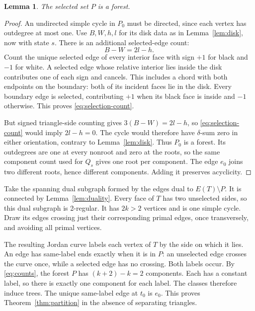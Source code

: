\documentclass[11pt]{article}
\newtheorem{lemma}[theorem]{Lemma}
\theoremstyle{remark}
\numberwithin{equation}{section}
\begin{document}
\begin{lemma}\label{lem:P-forest}
The selected set \(P\) is a forest.
\end{lemma}

\begin{proof}
An undirected simple cycle in \(P_0\) must be
directed, since each vertex has outdegree at most one.
Use \(B,W,h,l\) for its disk data as in
Lemma~\ref{lem:disk}, now with state \(s\).
There is an additional selected-edge count:
\begin{equation}\label{eq:selection-count}
 B-W=2l-h.
\end{equation}
Count the unique selected edge of every interior
face with sign \(+1\) for black and \(-1\) for white.
A selected edge whose relative interior lies inside the disk
contributes one of each sign and cancels. This includes a chord
with both endpoints on the boundary: both of its incident faces
lie in the disk. Every boundary edge
is selected, contributing \(+1\) when its black
face is inside and \(-1\) otherwise. This proves
\eqref{eq:selection-count}.

But signed triangle-side counting gives
\(3(B-W)=2l-h\), so \eqref{eq:selection-count}
would imply \(2l-h=0\). The cycle would therefore have
\(\delta\)-sum zero in either orientation, contrary to
Lemma~\ref{lem:disk}. Thus \(P_0\) is a forest.
Its outdegrees are one at every nonroot and zero at
the roots, so the same component count used for
\(Q_s\) gives one root per component.
The edge \(e_0\) joins two different roots, hence
different components. Adding it preserves acyclicity.
\end{proof}

Take the spanning dual subgraph formed by the edges
dual to \(E(T)\setminus P\). It is connected by
Lemma~\ref{lem:duality}. Every face of \(T\) has two
unselected sides, so this dual subgraph is 2-regular.
It has \(2k>2\) vertices and is one simple cycle.
Draw its edges crossing just their corresponding
primal edges, once transversely, and avoiding all
primal vertices.

The resulting Jordan curve labels each vertex of
\(T\) by the side on which it lies. An edge has
same-label ends exactly when it is in \(P\):
an unselected edge crosses the curve once, while
a selected edge has no crossing. Both labels occur.
By \eqref{eq:counts}, the forest \(P\) has
\((k+2)-k=2\) components. Each has a constant label,
so there is exactly one component for each label.
The classes therefore induce trees. The unique
same-label edge at \(t_0\) is \(e_0\).
This proves Theorem~\ref{thm:partition} in the absence
of separating triangles.
\end{document}
